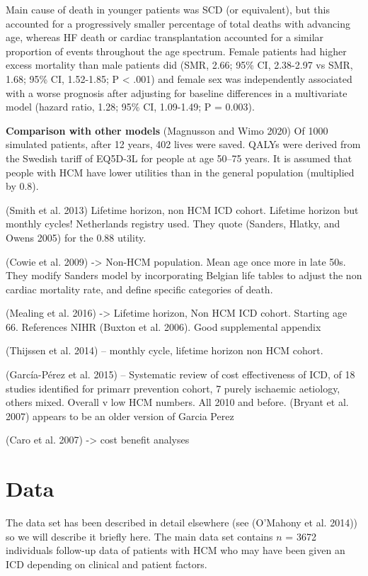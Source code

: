 \documentclass[
]{article}
\begin{document}
Main cause of death in younger patients was SCD (or equivalent), but
this accounted for a progressively smaller percentage of total deaths
with advancing age, whereas HF death or cardiac transplantation
accounted for a similar proportion of events throughout the age
spectrum. Female patients had higher excess mortality than male patients
did (SMR, 2.66; 95\% CI, 2.38-2.97 vs SMR, 1.68; 95\% CI, 1.52-1.85; P
\textless{} .001) and female sex was independently associated with a
worse prognosis after adjusting for baseline differences in a
multivariate model (hazard ratio, 1.28; 95\% CI, 1.09-1.49; P = 0.003).

\textbf{Comparison with other models} (Magnusson and Wimo 2020) Of 1000
simulated patients, after 12 years, 402 lives were saved. QALYs were
derived from the Swedish tariff of EQ5D-3L for people at age 50--75
years. It is assumed that people with HCM have lower utilities than in
the general population (multiplied by 0.8).

(Smith et al. 2013) Lifetime horizon, non HCM ICD cohort. Lifetime
horizon but monthly cycles! Netherlands registry used. They quote
(Sanders, Hlatky, and Owens 2005) for the 0.88 utility.

(Cowie et al. 2009) -\textgreater{} Non-HCM population. Mean age once
more in late 50s. They modify Sanders model by incorporating Belgian
life tables to adjust the non cardiac mortality rate, and define
specific categories of death.

(Mealing et al. 2016) -\textgreater{} Lifetime horizon, Non HCM ICD
cohort. Starting age 66. References NIHR (Buxton et al. 2006). Good
supplemental appendix

(Thijssen et al. 2014) -- monthly cycle, lifetime horizon non HCM
cohort.

(García-Pérez et al. 2015) -- Systematic review of cost effectiveness of
ICD, of 18 studies identified for primarr prevention cohort, 7 purely
ischaemic aetiology, others mixed. Overall v low HCM numbers. All 2010
and before. (Bryant et al. 2007) appears to be an older version of
Garcia Perez

(Caro et al. 2007) -\textgreater{} cost benefit analyses

\hypertarget{data}{%
\section{Data}\label{data}}

The data set has been described in detail elsewhere (see (O'Mahony et
al. 2014)) so we will describe it briefly here. The main data set
contains \(n\) = 3672 individuals follow-up data of patients with HCM
who may have been given an ICD depending on clinical and patient
factors.
\end{document}

